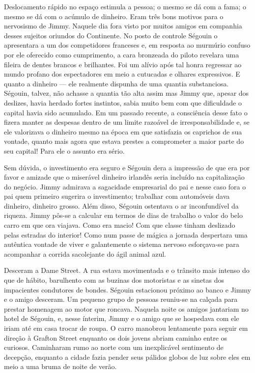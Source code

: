 Deslocamento rápido no espaço estimula a pessoa; o mesmo se dá com a fama; o
mesmo se dá com o acúmulo de dinheiro.  Eram três bons motivos para o
nervosismo de Jimmy.  Naquele dia fora visto por muitos amigos em companhia
desses sujeitos oriundos do Continente.  No posto de controle Ségouin o
apresentara a um dos competidores franceses e, em resposta ao murmúrio confuso
por ele oferecido como cumprimento, a cara bronzeada do piloto revelara uma
fileira de dentes brancos e brilhantes.  Foi um alívio após tal honra regressar
ao mundo profano dos espectadores em meio a cutucadas e olhares expressivos.  E
quanto a dinheiro --- ele realmente dispunha de uma quantia substanciosa.
Ségouin, talvez, não achasse a quantia tão alta assim mas Jimmy que, apesar dos
deslizes, havia herdado fortes instintos, sabia muito bem com que dificuldade o
capital havia sido acumulado.  Em um passado recente, a consciência desse fato
o fizera manter as despesas dentro de um limite razoável de irresponsabilidade
e, se ele valorizava o dinheiro mesmo na época em que satisfazia os caprichos
de sua vontade, quanto mais agora que estava prestes a comprometer a maior
parte do seu capital!  Para ele o assunto era sério.

Sem dúvida, o investimento era seguro e Ségouin dera a impressão de que era por
favor e amizade que o miserável dinheiro irlandês seria incluído na
capitalização do negócio.  Jimmy admirava a sagacidade empresarial do pai e
nesse caso fora o pai quem primeiro sugerira o investimento; trabalhar com
automóveis dava dinheiro, dinheiro grosso.  Além disso, Ségouin ostentava o ar
inconfundível da riqueza.  Jimmy pôs-se a calcular em termos de dias de
trabalho o valor do belo carro em que ora viajava.  Como era macio!  Com que
classe tinham deslizado pelas estradas do interior!  Como num passe de mágica a
jornada despertara uma autêntica vontade de viver e galantemente o sistema
nervoso esforçava-se para acompanhar a corrida sacolejante do ágil animal azul.

Desceram a Dame Street.  A rua estava movimentada e o trânsito mais intenso do
que de hábito, barulhento com as buzinas dos motoristas e as sinetas dos
impacientes condutores de bondes.  Ségouin estacionou próximo ao banco e Jimmy
e o amigo desceram.  Um pequeno grupo de pessoas reuniu-se na calçada para
prestar homenagem ao motor que roncava.  Naquela noite os amigos jantariam no
hotel de Ségouin, e, nesse ínterim, Jimmy e o amigo que se hospedava com ele
iriam até em casa trocar de roupa.  O carro manobrou lentamente para seguir em
direção à Grafton Street enquanto os dois jovens abriam caminho entre os
curiosos.  Caminharam rumo ao norte com um inexplicável sentimento de decepção,
enquanto a cidade fazia pender seus pálidos globos de luz sobre eles em meio a
uma bruma de noite de verão.

